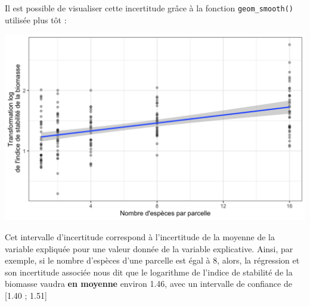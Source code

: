 \documentclass[a4paperpaper,]{article}
\newenvironment{Shaded}{\begin{snugshade}}{\end{snugshade}}
\newcommand{\CharTok}[1]{\textcolor[rgb]{0.57,0.30,0.62}{#1}}
\newcommand{\DataTypeTok}[1]{\textcolor[rgb]{0.00,0.34,0.68}{#1}}
\newcommand{\FloatTok}[1]{\textcolor[rgb]{0.69,0.50,0.00}{#1}}
\newcommand{\KeywordTok}[1]{\textcolor[rgb]{0.12,0.11,0.11}{\textbf{#1}}}
\newcommand{\NormalTok}[1]{\textcolor[rgb]{0.12,0.11,0.11}{#1}}
\newcommand{\OperatorTok}[1]{\textcolor[rgb]{0.12,0.11,0.11}{#1}}
\newcommand{\OtherTok}[1]{\textcolor[rgb]{0.00,0.43,0.16}{#1}}
\newcommand{\StringTok}[1]{\textcolor[rgb]{0.75,0.01,0.01}{#1}}
\begin{document}
Il est possible de visualiser cette incertitude grâce à la fonction \texttt{geom\_smooth()} utilisée plus tôt :

\begin{Shaded}
\end{Shaded}

\begin{center}\includegraphics[width=0.9\linewidth]{figure/unnamed-chunk-121-1} \end{center}

Cet intervalle d'incertitude correspond à l'incertitude de la moyenne de la variable expliquée pour une valeur donnée de la variable explicative. Ainsi, par exemple, si le nombre d'espèces d'une parcelle est égal à 8, alors, la régression et son incertitude associée nous dit que le logarithme de l'indice de stabilité de la biomasse vaudra \textbf{en moyenne} environ 1.46, avec un intervalle de confiance de {[}1.40 ; 1.51{]}
\end{document}
